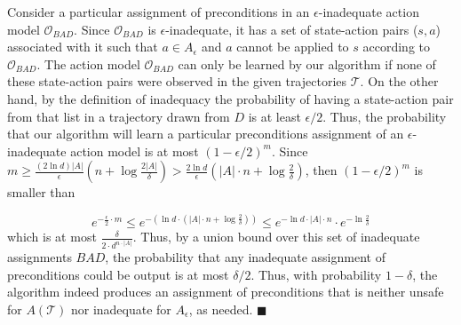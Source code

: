 \documentclass{article}
\newenvironment{proof}{\noindent{\bf Proof:~~}}{\qed}
\newcommand{\qed}{\hfill\ensuremath{\blacksquare}}
\begin{document}
\begin{proof}
		
		Consider a particular assignment of preconditions in an $\epsilon$-inadequate action model $\mathcal{O}_{BAD}$. Since $\mathcal{O}_{BAD}$ is $\epsilon$-inadequate, 
		it has a set of state-action pairs ($s,a$) associated with it such that $a\in A_\epsilon$ and $a$ cannot be applied to $s$ according to $\mathcal{O}_{BAD}$. 
		The action model $\mathcal{O}_{BAD}$ can only be learned by our algorithm 
		if none of these state-action pairs were observed in the given trajectories $\mathcal{T}$. 
		On the other hand, by the definition of inadequacy
		the probability of having a state-action pair from that list 
		in a trajectory drawn from $D$ is at least $\epsilon/2$. 
		Thus, the probability that our algorithm will learn a particular preconditions assignment of an $\epsilon$-inadequate action model is at most $(1-\epsilon/2)^m$.
		Since $m\geq\frac{(2\ln  d)|A|}{\epsilon}(n+\log\frac{2|A|}{\delta})>\frac{2\ln d}{\epsilon}(|A|\cdot n+\log\frac{2}{\delta})$, then $(1-\epsilon/2)^m$ is smaller than 
		
		
		
		\begin{equation}
		e^{-\frac{\epsilon}{2} \cdot m}
		\leq 
		e^{-(\ln d \cdot (|A|\cdot n+\log\frac{2}{\delta}))}
		\leq e^{-\ln d \cdot |A|\cdot n}\cdot e^{-\ln  \frac{2}{\delta}}
		\end{equation}
		which is at most $\frac{\delta}{2\cdot d^{n\cdot |A|}}$. Thus, by a union bound over this set of inadequate assignments $BAD$, the probability that any inadequate assignment of preconditions could be output is at most $\delta/2$.
		Thus, with probability $1-\delta$, the algorithm indeed produces an assignment of preconditions that is neither unsafe for $A(\mathcal{T})$ nor inadequate for $A_\epsilon$, as needed.
	\end{proof}
	
\end{document}
